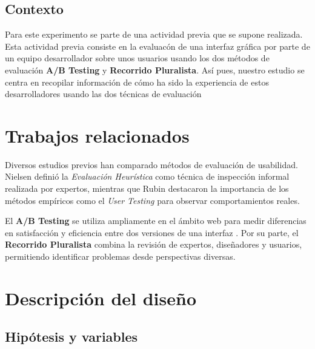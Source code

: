 \documentclass[a4paper,12pt]{report}
\begin{document}
\section{Contexto}
Para este experimento se parte de una actividad previa que se supone realizada. Esta actividad previa consiste en la evaluacón de una interfaz gráfica por parte de un equipo desarrollador sobre unos usuarios usando los dos métodos de evaluación \textbf{A/B Testing} y \textbf{Recorrido Pluralista}. Así pues, nuestro estudio se centra en recopilar información de cómo ha sido la experiencia de estos desarrolladores usando las dos técnicas de evaluación

\chapter{Trabajos relacionados}

Diversos estudios previos han comparado métodos de evaluación de usabilidad. Nielsen \cite{nielsen1994usability} definió la \textit{Evaluación Heurística} como técnica de inspección informal realizada por expertos, mientras que Rubin \cite{rubin2011handbook} destacaron la importancia de los métodos empíricos como el \textit{User Testing} para observar comportamientos reales.  

El \textbf{A/B Testing} se utiliza ampliamente en el ámbito web para medir diferencias en satisfacción y eficiencia entre dos versiones de una interfaz \cite{kohavi2009controlled}. Por su parte, el \textbf{Recorrido Pluralista} \cite{biasPluralistic} combina la revisión de expertos, diseñadores y usuarios, permitiendo identificar problemas desde perspectivas diversas.


\chapter{Descripción del diseño}

\section{Hipótesis y variables}
\end{document}
